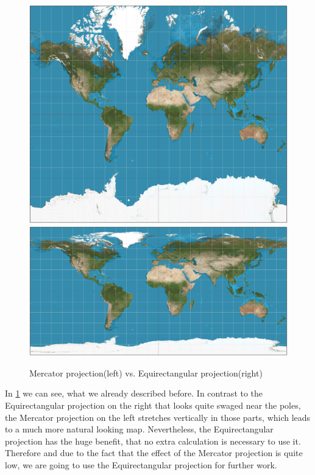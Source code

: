 \documentclass
[
	paper = a4,
    pagesize,
	12 pt,
	oneside,                       %
    open = right,
	DIV = calc,
	BCOR = 0 mm,                   %
	bibtotoc
]
{scrbook}
\begin{document}
\begin{figure}[H]
    \includegraphics[width=.5\textwidth]{Images/Mercator_projection_SW.jpg}
    \includegraphics[width=.5\textwidth]{Images/Equirectangular_projection_SW.jpg}
\caption[]{Mercator projection(left) vs. Equirectangular projection(right)}
\label{fig:projections}
\end{figure}

In \cref{fig:projections} we can see, what we already described before.
In contrast to the Equirectangular projection on the right that looks quite swaged near the poles, the Mercator projection on the left stretches vertically in those parts, which leads to a much more natural looking map.
Nevertheless, the Equirectangular projection has the huge benefit, that no extra calculation is necessary to use it.
Therefore and due to the fact that the effect of the Mercator projection is quite low, we are going to use the Equirectangular projection for further work.
\end{document}
